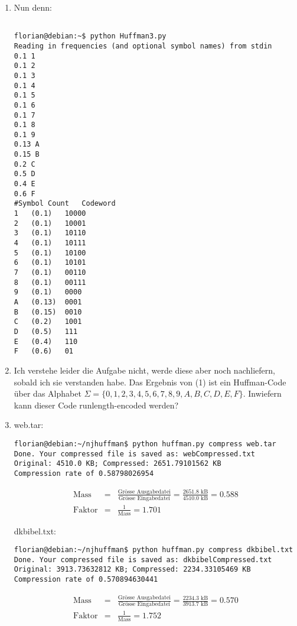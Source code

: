 \documentclass[11pt]{article} %
\theoremstyle{definition}
\begin{document}
\begin{enumerate}[(1)]

\item Nun denn:

\begin{verbatim}

florian@debian:~$ python Huffman3.py
Reading in frequencies (and optional symbol names) from stdin
0.1 1
0.1 2
0.1 3
0.1 4
0.1 5
0.1 6
0.1 7
0.1 8
0.1 9
0.13 A
0.15 B
0.2 C
0.5 D
0.4 E
0.6 F
#Symbol	Count	Codeword
1	(0.1)	10000
2	(0.1)	10001
3	(0.1)	10110
4	(0.1)	10111
5	(0.1)	10100
6	(0.1)	10101
7	(0.1)	00110
8	(0.1)	00111
9	(0.1)	0000
A	(0.13)	0001
B	(0.15)	0010
C	(0.2)	1001
D	(0.5)	111
E	(0.4)	110
F	(0.6)	01

\end{verbatim}

\item Ich verstehe leider die Aufgabe nicht, werde diese aber noch nachliefern, sobald ich sie verstanden habe. Das Ergebnis von (1) ist ein Huffman-Code über das Alphabet $\Sigma = \{ 0,1,2,3,4,5,6,7,8,9,A,B,C,D,E,F  \}$. Inwiefern kann dieser Code runlength-encoded werden?

\item web.tar:

\begin{verbatim}
florian@debian:~/njhuffman$ python huffman.py compress web.tar
Done. Your compressed file is saved as: webCompressed.txt
Original: 4510.0 KB; Compressed: 2651.79101562 KB
Compression rate of 0.58798026954
\end{verbatim}

\begin{eqnarray*}
\textrm{Mass} &=& \frac{\textrm{Grösse Ausgabedatei}}{\textrm{Grösse Eingabedatei}} = \frac{2651.8 \textrm{ kB}}{4510.0 \textrm{ kB}} = 0.588 \\
\textrm{Faktor} &=& \frac{1}{\textrm{Mass}} = 1.701
\end{eqnarray*}

dkbibel.txt:

\begin{verbatim}
florian@debian:~/njhuffman$ python huffman.py compress dkbibel.txt
Done. Your compressed file is saved as: dkbibelCompressed.txt
Original: 3913.73632812 KB; Compressed: 2234.33105469 KB
Compression rate of 0.570894630441
\end{verbatim}

\begin{eqnarray*}
\textrm{Mass} &=& \frac{\textrm{Grösse Ausgabedatei}}{\textrm{Grösse Eingabedatei}} = \frac{2234.3 \textrm{ kB}}{3913.7 \textrm{ kB}} = 0.570 \\
\textrm{Faktor} &=& \frac{1}{\textrm{Mass}} = 1.752
\end{eqnarray*}


\end{enumerate}
\end{document}

